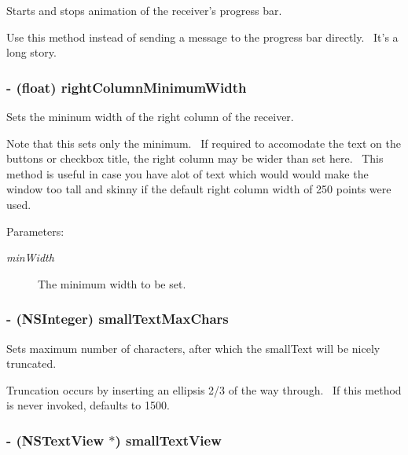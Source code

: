 Starts and stops animation of the receiver's progress bar. 

Use this method instead of sending a message to the progress bar directly.~ It's a long story. \hypertarget{interface_s_s_y_alert_69975a8b700fb1d2985b2794e0120e2f}{
\subsubsection[{rightColumnMinimumWidth}]{\setlength{\rightskip}{0pt plus 5cm}- (float) rightColumnMinimumWidth}}
\label{interface_s_s_y_alert_69975a8b700fb1d2985b2794e0120e2f}


Sets the mininum width of the right column of the receiver. 

Note that this sets only the minimum.~ If required to accomodate the text on the buttons or checkbox title, the right column may be wider than set here.~ This method is useful in case you have alot of text which would would make the window too tall and skinny if the default right column width of 250 points were used. \begin{Desc}
\item[Parameters:]
\begin{description}
\item[{\em minWidth}]The minimum width to be set. \end{description}
\end{Desc}
\hypertarget{interface_s_s_y_alert_bcde739174ec356844c26b7487ea1a79}{
\subsubsection[{smallTextMaxChars}]{\setlength{\rightskip}{0pt plus 5cm}- (NSInteger) smallTextMaxChars}}
\label{interface_s_s_y_alert_bcde739174ec356844c26b7487ea1a79}


Sets maximum number of characters, after which the smallText will be nicely truncated. 

Truncation occurs by inserting an ellipsis 2/3 of the way through.~ If this method is never invoked, defaults to 1500. \hypertarget{interface_s_s_y_alert_b15db601566d115c516c43320f306603}{
\subsubsection[{smallTextView}]{\setlength{\rightskip}{0pt plus 5cm}- (NSTextView $\ast$) smallTextView}}
\label{interface_s_s_y_alert_b15db601566d115c516c43320f306603}


